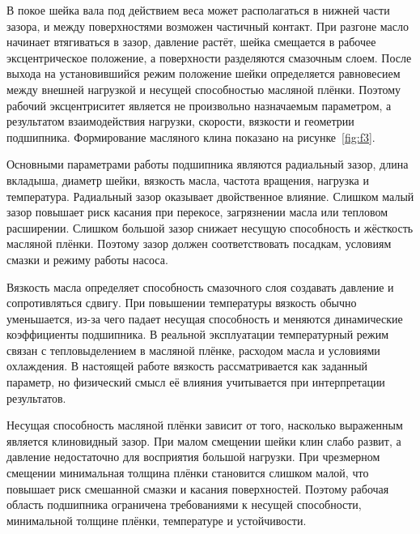 В покое шейка вала под действием веса может располагаться в нижней части зазора, и между поверхностями возможен частичный контакт. При разгоне масло начинает втягиваться в зазор, давление растёт, шейка смещается в рабочее эксцентрическое положение, а поверхности разделяются смазочным слоем. После выхода на установившийся режим положение шейки определяется равновесием между внешней нагрузкой и несущей способностью масляной плёнки. Поэтому рабочий эксцентриситет является не произвольно назначаемым параметром, а результатом взаимодействия нагрузки, скорости, вязкости и геометрии подшипника. Формирование масляного клина показано на рисунке~\ref{fig:f3}.

Основными параметрами работы подшипника являются радиальный зазор, длина вкладыша, диаметр шейки, вязкость масла, частота вращения, нагрузка и температура. Радиальный зазор оказывает двойственное влияние. Слишком малый зазор повышает риск касания при перекосе, загрязнении масла или тепловом расширении. Слишком большой зазор снижает несущую способность и жёсткость масляной плёнки. Поэтому зазор должен соответствовать посадкам, условиям смазки и режиму работы насоса.

Вязкость масла определяет способность смазочного слоя создавать давление и сопротивляться сдвигу. При повышении температуры вязкость обычно уменьшается, из-за чего падает несущая способность и меняются динамические коэффициенты подшипника. В реальной эксплуатации температурный режим связан с тепловыделением в масляной плёнке, расходом масла и условиями охлаждения. В настоящей работе вязкость рассматривается как заданный параметр, но физический смысл её влияния учитывается при интерпретации результатов.

Несущая способность масляной плёнки зависит от того, насколько выраженным является клиновидный зазор. При малом смещении шейки клин слабо развит, а давление недостаточно для восприятия большой нагрузки. При чрезмерном смещении минимальная толщина плёнки становится слишком малой, что повышает риск смешанной смазки и касания поверхностей. Поэтому рабочая область подшипника ограничена требованиями к несущей способности, минимальной толщине плёнки, температуре и устойчивости.

